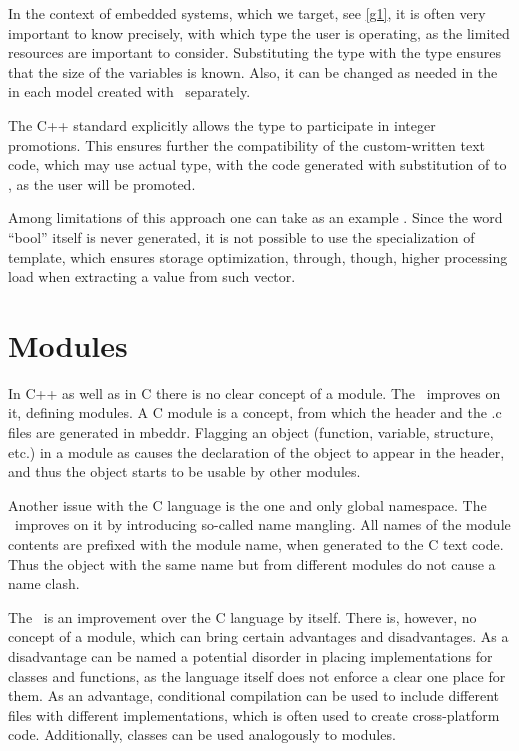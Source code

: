 In the context of embedded systems, which we target, see \ref{g1}, it is often very important to 
know precisely, with which type the user is operating, as the limited resources
are important to consider. Substituting the  type with the  type ensures that the size of the  variables is known.
Also, it can be changed as needed in the  in each model created with \mb\ separately.

The C++ standard explicitly allows the  type to participate in integer promotions. This ensures further the compatibility of the custom-written
text code, which may use actual  type, with the code generated with substitution of  to , as the user  will be promoted.

Among limitations of this approach one can take as an example . Since the word ``bool'' itself is never generated, 
it is not possible to use the specialization of template, which ensures storage optimization, through, though, higher processing load when
extracting a value from such vector.

\section{Modules}

In C++ as well as in C there is no clear concept of a module. The \mbp\ improves on it, defining 
modules. A C module is a concept, from which the header and the .c files are generated in mbeddr.
Flagging an object (function, variable, structure, etc.) in a module as  causes the declaration of the object to appear
in the header, and thus the object starts to be usable by other modules. 

Another issue with the C language is the one and only global namespace. The \mbp\ improves on it 
by introducing so-called name mangling. All names of the module contents are prefixed with the module name,
when generated to the C text code. Thus the object with the same name but from different modules do
not cause a name clash.

The \cpppl\ is an improvement over the C language by itself. There is, however, no concept of a module,
which can bring certain advantages and disadvantages. As a disadvantage can be named a potential disorder
in placing implementations for classes and functions, as the language itself does not enforce a clear
one place for them. As an advantage, conditional compilation can be used to include different files
with different implementations, which is often used to create cross-platform code. Additionally, classes
can be used analogously to modules.

